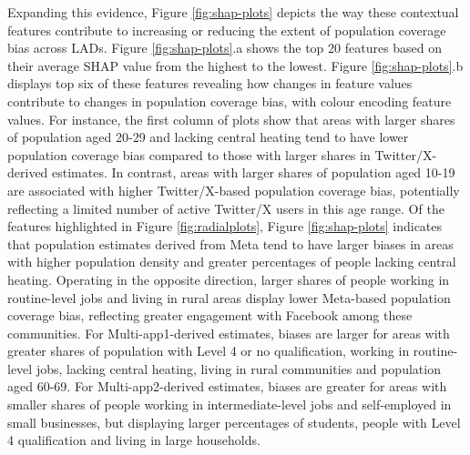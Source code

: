 \documentclass[]{rsos}%
\begin{document}
Expanding this evidence, Figure \ref{fig:shap-plots} depicts the way
these contextual features contribute to increasing or reducing the
extent of population coverage bias across LADs. Figure \ref{fig:shap-plots}.a
shows the top 20 features based on their average SHAP value from the
highest to the lowest. Figure \ref{fig:shap-plots}.b displays top six of
these features revealing how changes in feature values contribute to
changes in population coverage bias, with colour encoding feature values. For
instance, the first column of plots show that areas with larger shares
of population aged 20-29 and lacking central heating tend to have lower
population coverage bias compared to those with larger shares in
Twitter/X-derived estimates. In contrast, areas with larger shares of
population aged 10-19 are associated with higher Twitter/X-based
population coverage bias, potentially reflecting a limited number of active
Twitter/X users in this age range. Of the features highlighted in Figure
\ref{fig:radialplots}, Figure \ref{fig:shap-plots} indicates that
population estimates derived from Meta tend to have larger biases in
areas with higher population density and greater percentages of people
lacking central heating. Operating in the opposite direction, larger
shares of people working in routine-level jobs and living in rural areas
display lower Meta-based population coverage bias, reflecting greater engagement
with Facebook among these communities. For Multi-app1-derived estimates,
biases are larger for areas with greater shares of population with Level
4 or no qualification, working in routine-level jobs, lacking central
heating, living in rural communities and population aged 60-69. For
Multi-app2-derived estimates, biases are greater for areas with smaller
shares of people working in intermediate-level jobs and self-employed in
small businesses, but displaying larger percentages of students, people
with Level 4 qualification and living in large households.
\end{document}
